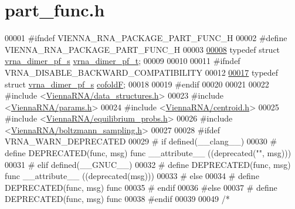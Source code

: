 \hypertarget{part__func_8h_source}{}\section{part\+\_\+func.\+h}
\label{part__func_8h_source}

\begin{DoxyCode}
00001 \textcolor{preprocessor}{#ifndef VIENNA\_RNA\_PACKAGE\_PART\_FUNC\_H}
00002 \textcolor{preprocessor}{#define VIENNA\_RNA\_PACKAGE\_PART\_FUNC\_H}
00003 
\hyperlink{group__pf__cofold_ga444df1587c9a2ca15b8eb25188f629c3}{00008} \textcolor{keyword}{typedef} \textcolor{keyword}{struct }\hyperlink{group__pf__cofold_structvrna__dimer__pf__s}{vrna\_dimer\_pf\_s} \hyperlink{group__pf__cofold_structvrna__dimer__pf__s}{vrna\_dimer\_pf\_t};
00009 
00010 
00011 \textcolor{preprocessor}{#ifndef VRNA\_DISABLE\_BACKWARD\_COMPATIBILITY}
00012 
\hyperlink{group__pf__cofold_ga5445d8d96a40e9e79b1fa5a7f1a6b7ea}{00017} \textcolor{keyword}{typedef} \textcolor{keyword}{struct }\hyperlink{group__pf__cofold_structvrna__dimer__pf__s}{vrna\_dimer\_pf\_s} \hyperlink{group__pf__cofold_structvrna__dimer__pf__s}{cofoldF};
00018 
00019 \textcolor{preprocessor}{#endif}
00020 
00021 
00022 \textcolor{preprocessor}{#include <\hyperlink{data__structures_8h}{ViennaRNA/data\_structures.h}>}
00023 \textcolor{preprocessor}{#include <\hyperlink{params_8h}{ViennaRNA/params.h}>}
00024 \textcolor{preprocessor}{#include <\hyperlink{centroid_8h}{ViennaRNA/centroid.h}>}
00025 \textcolor{preprocessor}{#include <\hyperlink{equilibrium__probs_8h}{ViennaRNA/equilibrium\_probs.h}>}
00026 \textcolor{preprocessor}{#include <\hyperlink{boltzmann__sampling_8h}{ViennaRNA/boltzmann\_sampling.h}>}
00027 
00028 \textcolor{preprocessor}{#ifdef VRNA\_WARN\_DEPRECATED}
00029 \textcolor{preprocessor}{# if defined(\_\_clang\_\_)}
00030 \textcolor{preprocessor}{#  define DEPRECATED(func, msg) func \_\_attribute\_\_ ((deprecated("", msg)))}
00031 \textcolor{preprocessor}{# elif defined(\_\_GNUC\_\_)}
00032 \textcolor{preprocessor}{#  define DEPRECATED(func, msg) func \_\_attribute\_\_ ((deprecated(msg)))}
00033 \textcolor{preprocessor}{# else}
00034 \textcolor{preprocessor}{#  define DEPRECATED(func, msg) func}
00035 \textcolor{preprocessor}{# endif}
00036 \textcolor{preprocessor}{#else}
00037 \textcolor{preprocessor}{# define DEPRECATED(func, msg) func}
00038 \textcolor{preprocessor}{#endif}
00039 
00049 \textcolor{comment}{/*}

\end{DoxyCode}
